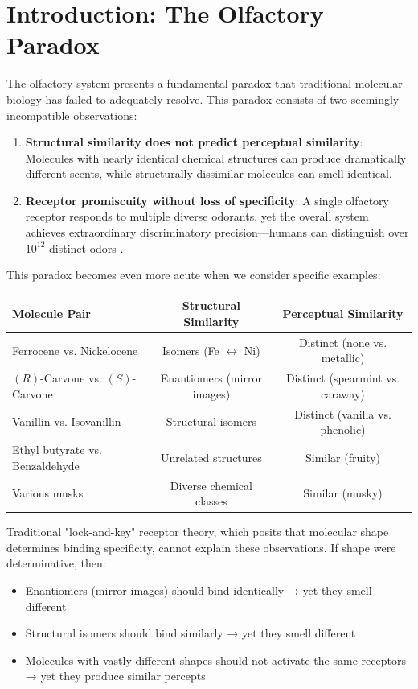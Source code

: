 
\section{Introduction: The Olfactory Paradox}

The olfactory system presents a fundamental paradox that traditional molecular biology has failed to adequately resolve. This paradox consists of two seemingly incompatible observations:

\begin{enumerate}
\item \textbf{Structural similarity does not predict perceptual similarity}: Molecules with nearly identical chemical structures can produce dramatically different scents, while structurally dissimilar molecules can smell identical.

\item \textbf{Receptor promiscuity without loss of specificity}: A single olfactory receptor responds to multiple diverse odorants, yet the overall system achieves extraordinary discriminatory precision—humans can distinguish over $10^{12}$ distinct odors \cite{bushdid2014humans}.
\end{enumerate}

This paradox becomes even more acute when we consider specific examples:

\begin{center}
\begin{tabular}{lcc}
\toprule
\textbf{Molecule Pair} & \textbf{Structural Similarity} & \textbf{Perceptual Similarity} \\
\midrule
Ferrocene vs. Nickelocene & Isomers (Fe $\leftrightarrow$ Ni) & Distinct (none vs. metallic) \\
$(R)$-Carvone vs. $(S)$-Carvone & Enantiomers (mirror images) & Distinct (spearmint vs. caraway) \\
Vanillin vs. Isovanillin & Structural isomers & Distinct (vanilla vs. phenolic) \\
\midrule
Ethyl butyrate vs. Benzaldehyde & Unrelated structures & Similar (fruity) \\
Various musks & Diverse chemical classes & Similar (musky) \\
\bottomrule
\end{tabular}
\end{center}

Traditional "lock-and-key" receptor theory, which posits that molecular shape determines binding specificity, cannot explain these observations. If shape were determinative, then:
\begin{itemize}
\item Enantiomers (mirror images) should bind identically → yet they smell different
\item Structural isomers should bind similarly → yet they smell different
\item Molecules with vastly different shapes should not activate the same receptors → yet they produce similar percepts
\end{itemize}

